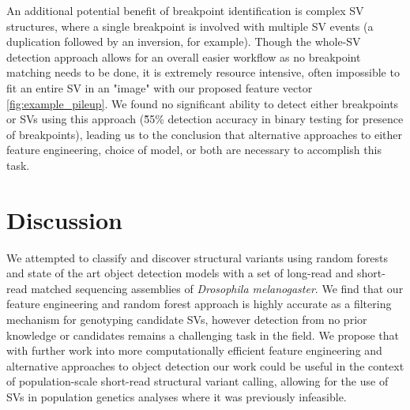 An additional potential benefit of breakpoint identification is complex SV structures, where a single breakpoint is involved with multiple SV events (a duplication followed by an inversion, for example). Though the whole-SV detection approach allows for an overall easier workflow as no breakpoint matching needs to be done, it is extremely resource intensive, often impossible to fit an entire SV in an "image" with our proposed feature vector \ref{fig:example_pileup}. We found no significant ability to detect either breakpoints or SVs using this approach (\~55\% detection accuracy in binary testing for presence of breakpoints), leading us to the conclusion that alternative approaches to either feature engineering, choice of model, or both are necessary to accomplish this task. 

\section{Discussion}

We attempted to classify and discover structural variants using random forests and state of the art object detection models with a set of long-read and short-read matched sequencing assemblies of \textit{Drosophila melanogaster}. We find that our feature engineering and random forest approach is highly accurate as a filtering mechanism for genotyping candidate SVs, however detection from no prior knowledge or candidates remains a challenging task in the field. We propose that with further work into more computationally efficient feature engineering and alternative approaches to object detection our work could be useful in the context of population-scale short-read structural variant calling, allowing for the use of SVs in population genetics analyses where it was previously infeasible. 